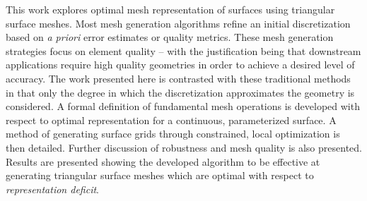 This work explores optimal mesh representation of surfaces using 
triangular surface meshes. 
Most mesh generation algorithms refine an initial discretization based on 
{\it a priori} error estimates or quality metrics. These mesh generation 
strategies focus on element quality -- with the justification being that 
downstream applications require high quality geometries in order to 
achieve a desired level of accuracy. The work presented here is contrasted 
with these traditional methods in that only the degree in which the 
discretization approximates the geometry is considered. A formal 
definition of fundamental mesh operations is developed with respect to 
optimal representation for a continuous, parameterized surface. A method 
of generating surface grids through constrained, local optimization is 
then detailed. Further discussion of robustness and mesh quality is also 
presented. Results are presented showing the developed algorithm to be 
effective at generating triangular surface meshes which are optimal with 
respect to {\it representation deficit}.
